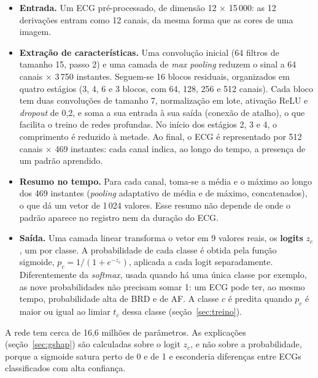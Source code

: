 \documentclass[11pt,a4paper]{article}
\begin{document}
\begin{itemize}
\item \textbf{Entrada.} Um ECG pré-processado, de dimensão 12 × 15\,000: as 12 derivações entram como 12 canais, da mesma forma que as cores de uma imagem.
\item \textbf{Extração de características.} Uma convolução inicial (64 filtros de tamanho 15, passo 2) e uma camada de \textit{max pooling} reduzem o sinal a 64 canais × 3\,750 instantes. Seguem-se 16 blocos residuais, organizados em quatro estágios (3, 4, 6 e 3 blocos, com 64, 128, 256 e 512 canais). Cada bloco tem duas convoluções de tamanho 7, normalização em lote, ativação ReLU e \textit{dropout} de 0,2, e soma a sua entrada à sua saída (conexão de atalho), o que facilita o treino de redes profundas. No início dos estágios 2, 3 e 4, o comprimento é reduzido à metade. Ao final, o ECG é representado por 512 canais × 469 instantes: cada canal indica, ao longo do tempo, a presença de um padrão aprendido.
\item \textbf{Resumo no tempo.} Para cada canal, toma-se a média e o máximo ao longo dos 469 instantes (\textit{pooling} adaptativo de média e de máximo, concatenados), o que dá um vetor de 1\,024 valores. Esse resumo não depende de onde o padrão aparece no registro nem da duração do ECG.
\item \textbf{Saída.} Uma camada linear transforma o vetor em 9 valores reais, os \textbf{logits} $z_c$, um por classe. A probabilidade de cada classe é obtida pela função sigmoide, $p_c = 1/(1 + e^{-z_c})$, aplicada a cada logit separadamente. Diferentemente da \textit{softmax}, usada quando há uma única classe por exemplo, as nove probabilidades não precisam somar 1: um ECG pode ter, ao mesmo tempo, probabilidade alta de BRD e de AF. A classe $c$ é predita quando $p_c$ é maior ou igual ao limiar $t_c$ dessa classe (seção~\ref{sec:treino}).
\end{itemize}
A rede tem cerca de 16,6 milhões de parâmetros. As explicações (seção~\ref{sec:gshap}) são calculadas sobre o logit $z_c$, e não sobre a probabilidade, porque a sigmoide satura perto de 0 e de 1 e esconderia diferenças entre ECGs classificados com alta confiança.
\end{document}
